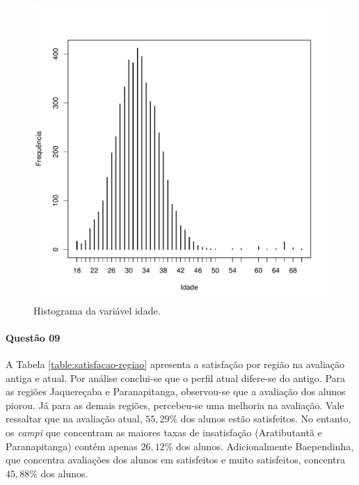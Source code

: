 \documentclass[10pt,a4paper,oneside]{article}
\newcommand{\arat}{Aratibutantã\xspace}
\newcommand{\baep}{Baependinha\xspace}
\newcommand{\jaqu}{Jaquereçaba\xspace}
\newcommand{\para}{Paranapitanga\xspace}
\begin{document}
\begin{figure}[!h]
	\centering
	\includegraphics[width=\linewidth]{plots/histograma-idade}
	\caption{Histograma da variável idade. }
	\label{fig:histogram-idade}
\end{figure}

\FloatBarrier

\paragraph{Questão 09}

A Tabela \ref{table:satisfacao-regiao} apresenta a satisfação por região na avaliação antiga e atual. Por análise conclui-se que o perfil atual difere-se do antigo. Para as regiões \jaqu e \para, observou-se que a avaliação dos alunos piorou. Já para as demais regiões, percebeu-se uma melhoria na avaliação. Vale ressaltar que na avaliação atual, $55,29\%$ dos alunos estão satisfeitos. No entanto, os \textit{campi} que concentram as maiores taxas de insatisfação (\arat e \para) contém apenas $26,12\%$ dos alunos. Adicionalmente \baep, que concentra avaliações dos alunos em satisfeitos e muito satisfeitos, concentra $45,88\%$ dos alunos.
\end{document}
